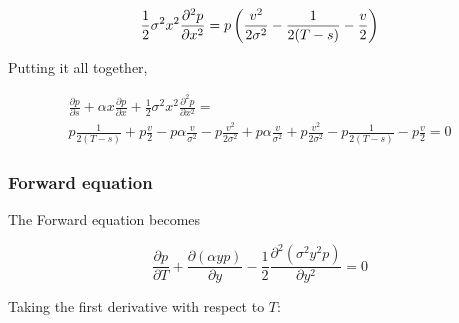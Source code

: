 \documentclass{article}
\theoremstyle{definition}
\begin{document}
\[\frac{1}{2} \sigma^2 x^2 \frac{\partial^2 p}{\partial x^2}\\=p\left( \frac{v^2 }{2\sigma^2}- \frac{1}{ 2(T-s)} - \frac{v }{ 2}      \right)\]

Putting it all together,



\begin{multline*}
\frac{\partial p} {\partial s} +\alpha x \frac{\partial p}{\partial x} + \frac{1}{2} \sigma^2 x^2 \frac{\partial^2 p}{\partial x^2}= \\ p\frac{1}{2(T-s)} + p\frac{v}{2}   - p \alpha \frac{v}{\sigma^2}  -p\frac{v^2}{2\sigma^2}  +  p \alpha \frac{v }{\sigma^2} + p\frac{v^2 }{2\sigma^2 }- p\frac{1}{ 2(T-s)} -p \frac{v }{ 2} =0
\end{multline*}

\subsubsection{Forward equation}
The Forward equation becomes

\[\frac{\partial p} {\partial T}+\frac{\partial \left(\alpha y p\right)}{\partial y}-\frac{1}{2} \frac{\partial^2 \left(\sigma^2 y^2 p\right)}{\partial y^2} =0 \]

Taking the first derivative with respect to \(T\):
\end{document}

